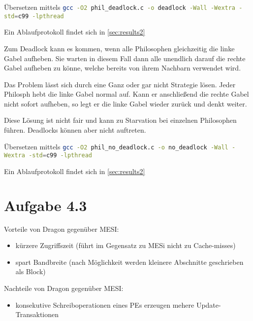 \documentclass{scrartcl}
\begin{document}
Übersetzen mittels \lstinline[language=Bash]$gcc -O2 phil_deadlock.c -o deadlock -Wall -Wextra -std=c99 -lpthread$

Ein Ablaufprotokoll findet sich in \autoref{sec:results2}



Zum Deadlock kann es kommen, wenn alle Philosophen gleichzeitig die linke Gabel aufheben. Sie warten in diesem Fall dann alle unendlich darauf die rechte Gabel aufheben zu könne, welche bereits von ihrem Nachbarn verwendet wird.

Das Problem lässt sich durch eine \glqq Ganz oder gar nicht \grqq Strategie lösen. Jeder Philosph hebt die linke Gabel normal auf. Kann er anschließend die rechte Gabel nicht sofort aufheben, so legt er die linke Gabel wieder zurück und denkt weiter.

Diese Lösung ist nicht fair und kann zu Starvation bei einzelnen Philosophen führen. Deadlocks können aber nicht auftreten.

Übersetzen mittels \lstinline[language=Bash]$gcc -O2 phil_no_deadlock.c -o no_deadlock -Wall -Wextra -std=c99 -lpthread$

Ein Ablaufprotokoll findet sich in \autoref{sec:results2}



\section*{Aufgabe 4.3}

Vorteile von Dragon gegenüber MESI:

\begin{itemize}
	\item kürzere Zugriffszeit (führt im Gegensatz zu MESi nicht zu Cache-misses)
	\item spart Bandbreite (nach Möglichkeit werden kleinere Abschnitte
geschrieben als Block)
\end{itemize}

Nachteile von Dragon gegenüber MESI:

\begin{itemize}
	\item konsekutive Schreiboperationen eines PEs erzeugen mehere
Update-Transaktionen
\end{itemize}
\end{document}
